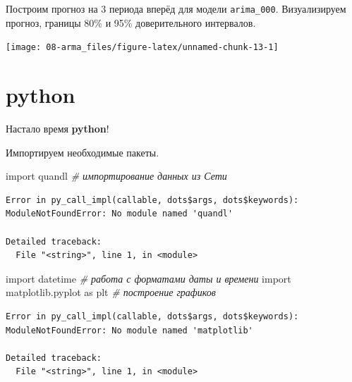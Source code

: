 \documentclass[]{book}
\newenvironment{Shaded}{\begin{snugshade}}{\end{snugshade}}
\newcommand{\CommentTok}[1]{\textcolor[rgb]{0.56,0.35,0.01}{\textit{#1}}}
\newcommand{\DataTypeTok}[1]{\textcolor[rgb]{0.13,0.29,0.53}{#1}}
\newcommand{\DecValTok}[1]{\textcolor[rgb]{0.00,0.00,0.81}{#1}}
\newcommand{\ImportTok}[1]{#1}
\newcommand{\KeywordTok}[1]{\textcolor[rgb]{0.13,0.29,0.53}{\textbf{#1}}}
\newcommand{\NormalTok}[1]{#1}
\newcommand{\OperatorTok}[1]{\textcolor[rgb]{0.81,0.36,0.00}{\textbf{#1}}}
\begin{document}
Построим прогноз на 3 периода вперёд для модели \texttt{arima\_000}. Визуализируем прогноз, границы 80\% и 95\% доверительного интервалов.

\begin{Shaded}
\end{Shaded}

\begin{center}\texttt{[image: 08-arma\_files/figure-latex/unnamed-chunk-13-1]} \end{center}

\hypertarget{python-2}{%
\section{python}\label{python-2}}

Настало время \textbf{python}!

Импортируем необходимые пакеты.

\begin{Shaded}
\begin{Highlighting}[]
\ImportTok{import}\NormalTok{ quandl }\CommentTok{# импортирование данных из Сети}
\end{Highlighting}
\end{Shaded}

\begin{verbatim}
Error in py_call_impl(callable, dots$args, dots$keywords): ModuleNotFoundError: No module named 'quandl'

Detailed traceback: 
  File "<string>", line 1, in <module>
\end{verbatim}

\begin{Shaded}
\begin{Highlighting}[]
\ImportTok{import}\NormalTok{ datetime }\CommentTok{# работа с форматами даты и времени}
\ImportTok{import}\NormalTok{ matplotlib.pyplot }\ImportTok{as}\NormalTok{ plt }\CommentTok{# построение графиков}
\end{Highlighting}
\end{Shaded}

\begin{verbatim}
Error in py_call_impl(callable, dots$args, dots$keywords): ModuleNotFoundError: No module named 'matplotlib'

Detailed traceback: 
  File "<string>", line 1, in <module>
\end{verbatim}
\end{document}
